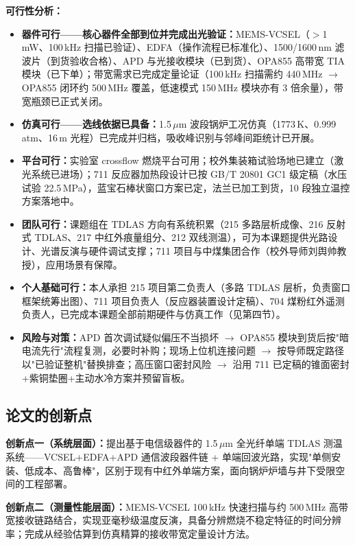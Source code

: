 \documentclass[12pt,a4paper]{article}
\begin{document}
\textbf{可行性分析：}
\begin{itemize}
  \item \textbf{器件可行——核心器件全部到位并完成出光验证：}MEMS-VCSEL（$>$1\,mW、100\,kHz 扫描已验证）、EDFA（操作流程已标准化）、1500/1600\,nm 滤波片（到货验收合格）、APD 与光接收模块（已到货）、OPA855 高带宽 TIA 模块（已下单）；带宽需求已完成定量论证（100\,kHz 扫描需约 440\,MHz $\rightarrow$ OPA855 闭环约 500\,MHz 覆盖，低速模式 150\,MHz 模块亦有 3 倍余量），带宽瓶颈已正式关闭。
  \item \textbf{仿真可行——选线依据已具备：}1.5\,$\mu$m 波段锅炉工况仿真（1773\,K、0.999\,atm、16\,m 光程）已完成并归档，吸收峰识别与邻峰间距统计已开展。
  \item \textbf{平台可行：}实验室 crossflow 燃烧平台可用；校外集装箱试验场地已建立（激光系统已进场）；711 反应器加热段设计已按 GB/T 20801 GC1 级定稿（水压试验 22.5\,MPa），蓝宝石棒状窗口方案已定，法兰已加工到货，10 段独立温控方案落地中。
  \item \textbf{团队可行：}课题组在 TDLAS 方向有系统积累（215 多路层析成像、216 反射式 TDLAS、217 中红外痕量组分、212 双线测温），可为本课题提供光路设计、光谱反演与硬件调试支撑；711 项目与中煤集团合作（校外导师刘舆帅教授），应用场景有保障。
  \item \textbf{个人基础可行：}本人承担 215 项目第二负责人（多路 TDLAS 层析，负责窗口框架统筹出图）、711 项目负责人（反应器装置设计定稿）、704 煤粉红外遥测负责人，已完成本课题全部前期硬件与仿真工作（见第四节）。
  \item \textbf{风险与对策：}APD 首次调试疑似偏压不当损坏 $\rightarrow$ OPA855 模块到货后按"暗电流先行"流程复测，必要时补购；现场上位机连接问题 $\rightarrow$ 按导师既定路径以"已验证整机"替换排查；高压窗口密封风险 $\rightarrow$ 沿用 711 已定稿的锥面密封+紫铜垫圈+主动水冷方案并预留盲板。
\end{itemize}

\subsection{论文的创新点}

\textbf{创新点一（系统层面）：}提出基于电信级器件的 1.5\,$\mu$m 全光纤单端 TDLAS 测温系统——VCSEL+EDFA+APD 通信波段器件链 + 单端回波光路，实现"单侧安装、低成本、高鲁棒"，区别于现有中红外单端方案，面向锅炉炉墙与井下受限空间的工程部署。

\textbf{创新点二（测量性能层面）：}MEMS-VCSEL 100\,kHz 快速扫描与约 500\,MHz 高带宽接收链路结合，实现亚毫秒级温度反演，具备分辨燃烧不稳定特征的时间分辨率；完成从经验估算到仿真精算的接收带宽定量设计方法。
\end{document}
